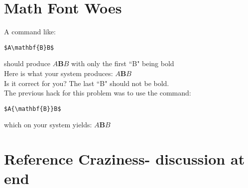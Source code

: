 \documentclass[10pt,twocolumn]{IEEEtran}
\begin{document}
\section{Math Font Woes}

A command like: \begin{verbatim}$A\mathbf{B}B$\end{verbatim}
should produce $A{\mathbf{B}}B$ with only the first ``B" being bold\hfill\\
Here is what your system produces: $A\mathbf{B}B$ \hfill\\
Is it correct for you? The last ``B" should not be bold.\hfill\\
The previous hack for this problem was to use the command:
\begin{verbatim}$A{\mathbf{B}}B$\end{verbatim}
which on your system yields: $A{\mathbf{B}}B$

\section{Reference Craziness-   discussion at end}
\end{document}
